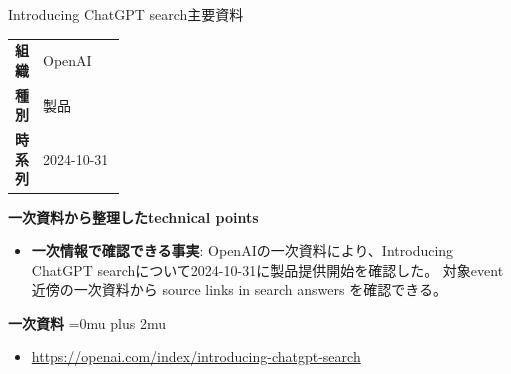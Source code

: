 \begin{technicalnote}{Introducing ChatGPT search}{主要資料}
\begingroup
\begin{tabularx}{\linewidth}{@{}>{\bfseries}p{0.22\linewidth}X@{}}
組織 & OpenAI \\
種別 & 製品 \\
時系列 & 2024-10-31 \\
\end{tabularx}
\smallskip
{\bfseries 一次資料から整理したtechnical points}
\begin{itemize}[leftmargin=1.5em,itemsep=0.35em]
\item \textbf{一次情報で確認できる事実}: OpenAIの一次資料により、Introducing ChatGPT searchについて2024-10-31に製品提供開始を確認した。 対象event近傍の一次資料から source links in search answers を確認できる。
\end{itemize}
\begin{minipage}{\linewidth}
\begin{samepage}
{\bfseries 一次資料}
\begingroup\sloppy
\Urlmuskip=0mu plus 2mu\relax
\begin{itemize}[leftmargin=1.5em,itemsep=0.25em]
\item {\scriptsize\url{https://openai.com/index/introducing-chatgpt-search}}
\end{itemize}
\endgroup
\end{samepage}
\end{minipage}
\endgroup
\end{technicalnote}
\medskip

